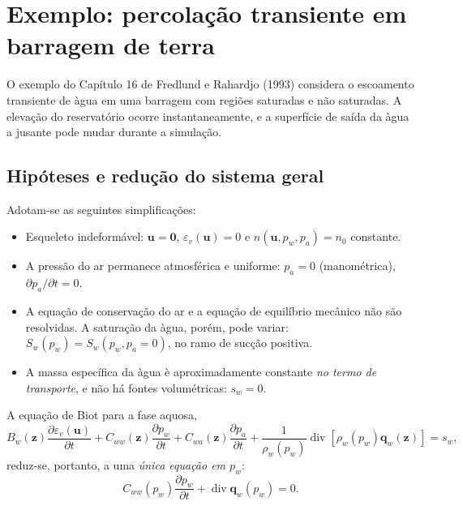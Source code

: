 \documentclass[11pt,a4paper]{article}
\numberwithin{equation}{section}
\newcommand{\Div}{\operatorname{div}}
\begin{document}
\section{Exemplo: percola\c{c}\~ao transiente em barragem de terra}\label{sec:barragem}

O exemplo do Cap\'itulo 16 de Fredlund e Rahardjo (1993) considera
o escoamento transiente de \`agua em uma barragem com regi\~oes
saturadas e n\~ao saturadas. A eleva\c{c}\~ao do reservat\'orio ocorre
instantaneamente, e a superf\'icie de sa\'ida da \`agua a jusante
pode mudar durante a simula\c{c}\~ao.

\subsection{Hip\'oteses e redu\c{c}\~ao do sistema geral}

Adotam-se as seguintes simplifica\c{c}\~oes:
\begin{itemize}
\item Esqueleto indeform\'avel:
$\mathbf u=\mathbf0$, $\varepsilon_v(\mathbf u)=0$ e
$n(\mathbf u,p_w,p_a)=n_0$ constante.
\item A press\~ao do ar permanece atmosf\'erica e uniforme:
$p_a=0$ (manom\'etrica), $\partial p_a/\partial t=0$.
\item A equa\c{c}\~ao de conserva\c{c}\~ao do ar e a equa\c{c}\~ao de
equil\'ibrio mec\^anico n\~ao s\~ao resolvidas. A satura\c{c}\~ao da
\`agua, por\'em, pode variar:
$S_w(p_w)=S_w(p_w,p_a=0)$, no ramo de suc\c{c}\~ao positiva.
\item A massa espec\'ifica da \`agua \`e aproximadamente constante
\emph{no termo de transporte}, e n\~ao h\'a fontes volum\'etricas:
$s_w=0$.
\end{itemize}

A equa\c{c}\~ao de Biot para a fase aquosa,
\begin{equation}
B_w(\mathbf z)\frac{\partial\varepsilon_v(\mathbf u)}{\partial t}
+C_{ww}(\mathbf z)\frac{\partial p_w}{\partial t}
+C_{wa}(\mathbf z)\frac{\partial p_a}{\partial t}
+\frac{1}{\rho_w(p_w)}\Div[\rho_w(p_w)\mathbf q_w(\mathbf z)]=s_w,
\end{equation}
reduz-se, portanto, a uma \emph{\'unica equa\c{c}\~ao em $p_w$}:
\begin{equation}
\boxed{C_{ww}(p_w)\frac{\partial p_w}{\partial t}
+\Div\mathbf q_w(p_w)=0.}
\end{equation}
\end{document}
